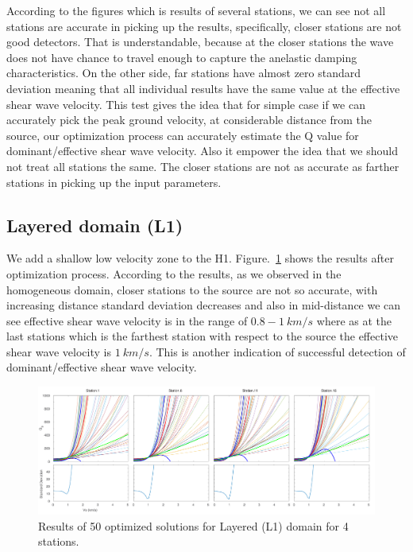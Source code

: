 According to the figures which is results of several stations, we can see not all stations are accurate in picking up the results, specifically, closer stations are not good detectors. That is understandable, because at the closer stations the wave does not have chance to travel enough to capture the anelastic damping characteristics. On the other side, far stations have almost zero standard deviation meaning that all individual results have the same value at the effective shear wave velocity. This test gives the idea that for simple case if we can accurately pick the peak ground velocity, at considerable distance from the source, our optimization process can accurately estimate the Q value for dominant/effective shear wave velocity. Also it empower the idea that we should not treat all stations the same. The closer stations are not as accurate as farther stations in picking up the input parameters. 

\subsection{Layered domain (L1)}

We add a shallow low velocity zone to the H1. Figure.~\ref{fig:station_1_1000_500_L1} shows the results after optimization process. According to the results, as we observed in the homogeneous domain, closer stations to the source are not so accurate, with increasing distance standard deviation decreases and also in mid-distance we can see effective shear wave velocity is in the range of $0.8-1 ~ km/s$ where as at the last stations which is the farthest station with respect to the source the effective shear wave velocity is $1~km/s$. This is another indication of successful detection of dominant/effective shear wave velocity.  

  \begin{figure}[ht]
    \centering
    \includegraphics[width=\textwidth]{figures/pdf/station_1_1000_500_L1.pdf}
    \caption{Results of 50 optimized solutions for Layered (L1) domain for 4 stations.}
    \label{fig:station_1_1000_500_L1}
\end{figure}

